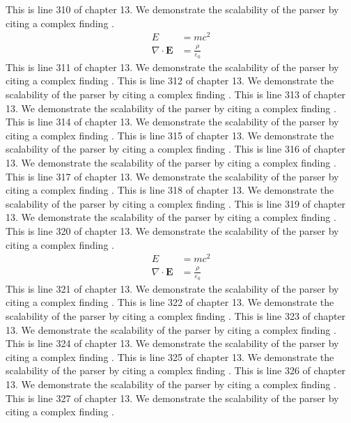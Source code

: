 This is line 310 of chapter 13. We demonstrate the scalability of the parser by citing a complex finding \cite{ref13_310}.
\begin{align*}
  E &= mc^2 \\
  \nabla \cdot \mathbf{E} &= \frac{\rho}{\varepsilon_0}
\end{align*}
This is line 311 of chapter 13. We demonstrate the scalability of the parser by citing a complex finding \cite{ref13_311}.
This is line 312 of chapter 13. We demonstrate the scalability of the parser by citing a complex finding \cite{ref13_312}.
This is line 313 of chapter 13. We demonstrate the scalability of the parser by citing a complex finding \cite{ref13_313}.
This is line 314 of chapter 13. We demonstrate the scalability of the parser by citing a complex finding \cite{ref13_314}.
This is line 315 of chapter 13. We demonstrate the scalability of the parser by citing a complex finding \cite{ref13_315}.
This is line 316 of chapter 13. We demonstrate the scalability of the parser by citing a complex finding \cite{ref13_316}.
This is line 317 of chapter 13. We demonstrate the scalability of the parser by citing a complex finding \cite{ref13_317}.
This is line 318 of chapter 13. We demonstrate the scalability of the parser by citing a complex finding \cite{ref13_318}.
This is line 319 of chapter 13. We demonstrate the scalability of the parser by citing a complex finding \cite{ref13_319}.
This is line 320 of chapter 13. We demonstrate the scalability of the parser by citing a complex finding \cite{ref13_320}.
\begin{align*}
  E &= mc^2 \\
  \nabla \cdot \mathbf{E} &= \frac{\rho}{\varepsilon_0}
\end{align*}
This is line 321 of chapter 13. We demonstrate the scalability of the parser by citing a complex finding \cite{ref13_321}.
This is line 322 of chapter 13. We demonstrate the scalability of the parser by citing a complex finding \cite{ref13_322}.
This is line 323 of chapter 13. We demonstrate the scalability of the parser by citing a complex finding \cite{ref13_323}.
This is line 324 of chapter 13. We demonstrate the scalability of the parser by citing a complex finding \cite{ref13_324}.
This is line 325 of chapter 13. We demonstrate the scalability of the parser by citing a complex finding \cite{ref13_325}.
This is line 326 of chapter 13. We demonstrate the scalability of the parser by citing a complex finding \cite{ref13_326}.
This is line 327 of chapter 13. We demonstrate the scalability of the parser by citing a complex finding \cite{ref13_327}.
